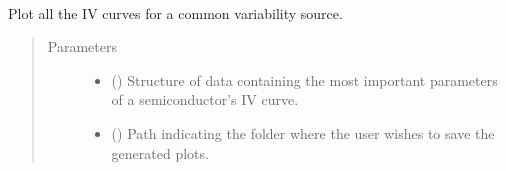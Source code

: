 \documentclass[letterpaper,10pt,english,openany, oneside]{sphinxmanual}
\begin{document}
\begin{fulllineitems}
\begin{fulllineitems}
\begin{quote}
\begin{description}
\begin{itemize}
\end{itemize}

\end{description}\end{quote}

\end{fulllineitems}


\begin{fulllineitems}
\label{\detokenize{index:fompy.plots.plotter.varplot}}~

\begin{fulllineitems}
Plot all the IV curves for a common variability source.

\end{fulllineitems}

\begin{quote}\begin{description}
\item[{Parameters}] \leavevmode\begin{itemize}
\item {} 
 () \textendash{} Structure of data containing the most important parameters of a semiconductor’s IV curve.

\item {} 
 (\sphinxstyleliteralemphasis{\sphinxupquote{, }}) \textendash{} Path indicating the folder where the user wishes to save the generated plots.

\end{itemize}

\end{description}\end{quote}

\end{fulllineitems}


\end{fulllineitems}

\label{\detokenize{index:module-fompy.wrappers}}
\end{document}
